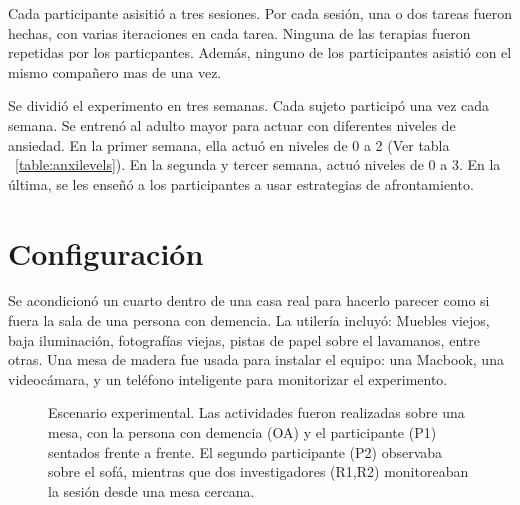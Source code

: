 Cada participante asisiti\'o a tres sesiones. Por cada sesi\'on, una o dos tareas fueron hechas, con varias iteraciones en cada tarea. Ninguna de las terapias fueron repetidas por los particpantes. Adem\'as, ninguno de los participantes asisti\'o con el mismo compa\~nero mas de una vez.

Se dividi\'o el experimento en tres semanas. Cada sujeto particip\'o una vez cada semana. Se entren\'o al adulto mayor para actuar con diferentes niveles de ansiedad. En la primer semana, ella actu\'o en niveles de 0 a 2 (Ver tabla ~\ref{table:anxilevels}). En la segunda y tercer semana, actu\'o niveles de 0 a 3. En la \'ultima, se les ense\~n\'o a los participantes a usar estrategias de afrontamiento.
\section{Configuraci\'on}\label{secc:setup}
	Se acondicion\'o un cuarto dentro de una casa real para hacerlo parecer como si fuera la sala de una persona con demencia. La utiler\'ia incluy\'o: Muebles viejos, baja iluminaci\'on, fotograf\'ias viejas, pistas de papel sobre el lavamanos, entre otras. Una mesa de madera fue usada para instalar el equipo: una Macbook, una videoc\'amara, y un tel\'efono inteligente para monitorizar el experimento.
\begin{figure}[h]
        \centering
        \caption{Escenario experimental. Las actividades fueron realizadas sobre una mesa, con la persona con demencia (OA) y el participante (P1) sentados frente a frente. El segundo participante (P2) observaba sobre el sof\'a, mientras que dos investigadores (R1,R2) monitoreaban la sesi\'on desde una mesa cercana.} \label{fig:img_exp_setup}
\end{figure}

